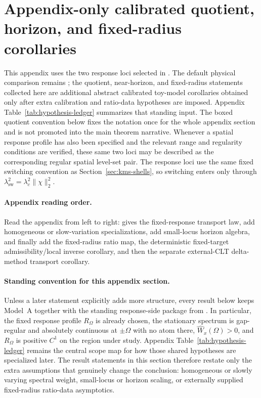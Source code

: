 \section{Appendix-only calibrated quotient, horizon, and fixed-radius corollaries}\label{sec:inverse}

This appendix uses the two response loci selected in
. The default
physical comparison remains ; the quotient,
near-horizon, and fixed-radius statements collected here are additional
abstract calibrated toy-model corollaries obtained only after extra
calibration and ratio-data hypotheses are imposed. Appendix
Table~\ref{tab:hypothesis-ledger} summarizes that standing input. The boxed
quotient convention below fixes the notation once for the whole appendix
section and is not promoted into the main theorem narrative. Whenever a
spatial response profile has also been specified and the relevant range and
regularity conditions are verified, these same two loci may be described as the
corresponding regular spatial level-set pair. The
response loci use the same fixed switching convention as
Section~\ref{sec:kms-shells}, so switching enters only through
$\lambda_{\mathrm{sw}}^2=\lambda_c^2\|\chi\|_2^2$.

\paragraph{Appendix reading order.}
Read the appendix from left to right:
 gives the fixed-response transport law,
 add homogeneous or
slow-variation specializations, 
add small-locus horizon algebra, and
finally add the fixed-radius ratio map, the deterministic fixed-target
admissibility/local inverse corollary, and then the separate external-CLT
delta-method transport corollary.

\paragraph{Standing convention for this appendix section.}
Unless a later statement explicitly adds more structure, every result below
keeps Model~A together with the standing response-side package from
. In particular, the fixed response profile
$R_\Omega$ is already chosen, the stationary spectrum is gap-regular and
absolutely continuous at $\pm\Omega$ with no atom there,
$\widehat W_x(\Omega)>0$, and $R_\Omega$ is positive $C^1$ on the region
under study. Appendix Table~\ref{tab:hypothesis-ledger} remains the central
scope map for how those shared hypotheses are specialized later. The result
statements in this section therefore restate only the extra assumptions that
genuinely change the conclusion: homogeneous or slowly varying spectral
weight, small-locus or horizon scaling, or externally supplied fixed-radius
ratio-data asymptotics.

